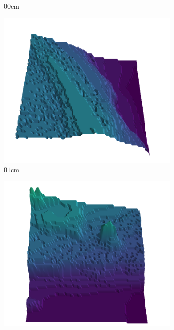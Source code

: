 \documentclass[../document.tex]{subfiles}
\begin{document}
\begin{figure}[htbp]
\begin{subfigure}[b]{0.19\textwidth}
        \caption{$00$cm}
        \end{subfigure}
        \begin{subfigure}[b]{0.19\textwidth}
        \includegraphics[width=\linewidth]{../img/5/quarry/all/worst/01-patch-3d-majavi-colormap-2.png}
        \caption{$01$cm}
        \end{subfigure}
        \begin{subfigure}[b]{0.19\textwidth}
        \includegraphics[width=\linewidth]{../img/5/quarry/all/worst/01-patch-3d-majavi-colormap-3.png}

\end{subfigure}
\end{figure}
\end{document}
